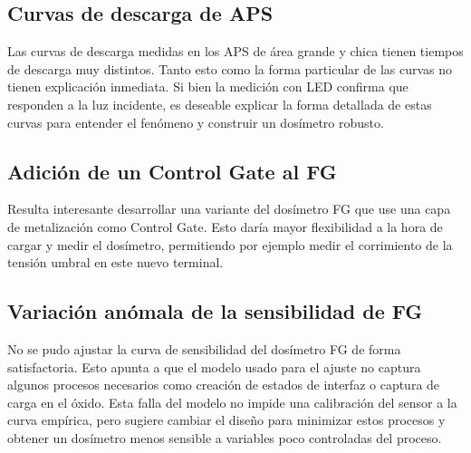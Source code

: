 \subsection{Curvas de descarga de APS}
Las curvas de descarga medidas en los APS de área grande y chica tienen tiempos
de descarga muy distintos.
Tanto esto como la forma particular de las curvas no tienen explicación
inmediata.
Si bien la medición con LED confirma que responden a la luz incidente,
es deseable explicar la forma detallada de estas curvas para entender el
fenómeno y construir un dosímetro robusto.
\subsection{Adición de un Control Gate al FG}
Resulta interesante desarrollar una variante del dosímetro FG que use una capa
de metalización como Control Gate.
Esto daría mayor flexibilidad a la hora de cargar y medir el dosímetro,
permitiendo por ejemplo medir el corrimiento de la tensión umbral en este
nuevo terminal.
\subsection{Variación anómala de la sensibilidad de FG}
No se pudo ajustar la curva de sensibilidad del dosímetro FG de forma
satisfactoria.
Esto apunta a que el modelo usado para el ajuste no captura algunos procesos
necesarios como creación de estados de interfaz o captura de carga en el óxido.
Esta falla del modelo no impide una calibración del sensor a la curva empírica,
pero sugiere cambiar el diseño para minimizar estos procesos y obtener un
dosímetro menos sensible a variables poco controladas del proceso.
